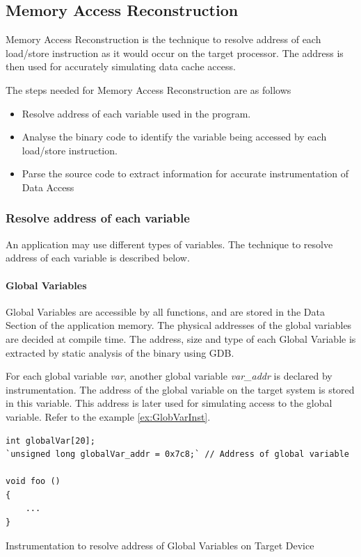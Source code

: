 \subsection{Memory Access Reconstruction}
Memory Access Reconstruction is the technique to resolve address of each load/store instruction as it would occur on the target processor. The address is then used for accurately simulating data cache access. 

The steps needed for Memory Access Reconstruction are as follows

\begin{itemize} \itemsep -6pt
\item Resolve address of each variable used in the program.
\item Analyse the binary code to identify the variable being accessed by each load/store instruction.
\item Parse the source code to extract information for accurate instrumentation of Data Access
\end{itemize}

\subsubsection{Resolve address of each variable}
An application may use different types of variables. The technique to resolve address of each variable is described below. 

\paragraph{Global Variables}
Global Variables are accessible by all functions, and are stored in the Data Section of the application memory. The physical addresses of the global variables are decided at compile time. The address, size and type of each Global Variable is extracted by static analysis of the binary using GDB. 

For each global variable \emph{var}, another global variable \emph{var\_addr} is declared by instrumentation. The address of the global variable on the target system is stored in this variable. This address is later used for simulating access to the global variable. Refer to the example \ref{ex:GlobVarInst}.

\vspace*{15pt}
\begin{Example}
\begin{lstlisting}
int globalVar[20];
`unsigned long globalVar_addr = 0x7c8;` // Address of global variable

void foo ()
{
    ...
}
\end{lstlisting}
\caption{Instrumentation to resolve address of Global Variables on Target Device}
\label{ex:GlobVarInst}
\end{Example}


